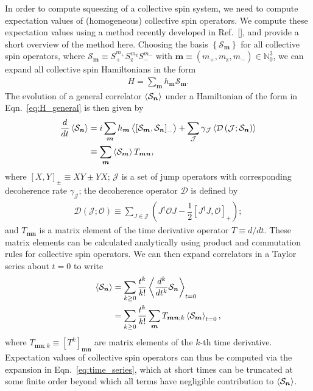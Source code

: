 \documentclass[aps,prx,superscriptaddress,notitlepage,twocolumn,longbibliography]{revtex4-2}
\newcommand{\f}[2]{\dfrac{#1}{#2}} %
\newcommand{\p}[1]{\left(#1\right)} %
\renewcommand{\sp}[1]{\left[#1\right]} %
\renewcommand{\set}[1]{\left\{#1\right\}} %
\renewcommand{\v}{\bm} %
\newcommand{\bk}{\Braket}
\newcommand{\J}{\mathcal{J}}
\renewcommand{\O}{\mathcal{O}}
\renewcommand{\S}{\mathcal{S}}
\newcommand{\z}{\text{z}}
\begin{document}
In order to compute squeezing of a collective spin system, we need to compute expectation values of (homogeneous) collective spin operators.
We compute these expectation values using a method recently developed in Ref.~[], and provide a short overview of the method here.
Choosing the basis $\set{\S_{\v m}}$ for all collective spin operators, where $\S_{\v m}\equiv S_+^{m_+} S_\z^{m_\z} S_-^{m_-}$ with
$\v m\equiv\p{m_+,m_\z,m_-}\in\mathbb{N}_0^3$, we can expand all
collective spin Hamiltonians in the form
\begin{align}
  H = \sum_{\v m} h_{\v m} \S_{\v m}.
  \label{eq:H_general}
\end{align}
The evolution of a general correlator $\bk{\S_{\v n}}$ under a Hamiltonian of the form in Eqn.~\eqref{eq:H_general} is then given by
\begin{align}
  \f{d}{dt} \bk{\S_{\v n}}
  &= i \sum_{\v m} h_{\v m}
  \bk{\sp{\S_{\v m}, \S_{\v n}}_-}
  + \sum_\J \gamma_\J \bk{\mathcal D\p{\J; \S_{\v n}}} \notag \\
  &\equiv \sum_{\v m} \bk{\S_{\v m}} T_{\v m\v n},
\end{align}
where $\sp{X,Y}_\pm\equiv XY\pm YX$; $\J$ is a set of jump operators with corresponding decoherence rate $\gamma_\J$; the decoherence operator $\mathcal D$ is defined by
\begin{align}
  \mathcal{D}\p{\J;\O}
  \equiv \sum_{J\in\J}\p{J^\dag \O J - \f12\sp{J^\dag J,\O}_+};
\end{align}
and $T_{\v m\v n}$ is a matrix element of the time derivative operator $T\equiv d/dt$.
These matrix elements can be calculated analytically using product and commutation rules for collective spin operators.
We can then expand correlators in a Taylor series about $t=0$ to write
\begin{align}
  \bk{\S_{\v n}}
  &= \sum_{k\ge0} \f{t^k}{k!} \bk{\f{d^k}{dt^k} \S_{\v n}}_{t=0}
  \notag \\
  &= \sum_{k\ge0} \f{t^k}{k!}
  \sum_{\v m} T_{\v m\v n;k} \bk{\S_{\v m}}_{t=0},
  \label{eq:time_series}
\end{align}
where $T_{\v m\v n;k}\equiv\sp{T^k}_{\v m\v n}$ are matrix elements of the $k$-th time derivative.
Expectation values of collective spin operators can thus be computed via the expansion in Eqn.~\eqref{eq:time_series}, which at short times can be truncated at some finite order beyond which all terms have negligible contribution to $\bk{\S_{\v n}}$.

\end{document}
